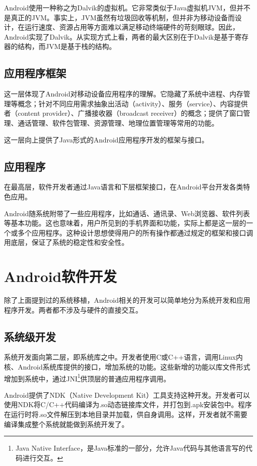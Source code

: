 Android使用一种称之为Dalvik的虚拟机。它非常类似于Java虚拟机JVM，但并不是真正的JVM。事实上，JVM虽然有垃圾回收等机制，但并非为移动设备而设计，在运行速度、资源占用等方面难以满足移动终端硬件的苛刻眼球。因此，Android实现了Dalvik。从实现方式上看，两者的最大区别在于Dalvik是基于寄存器的结构，而JVM是基于栈的结构。

\subsection{应用程序框架}
这一层体现了Android对移动设备应用程序的理解。它隐藏了系统中进程、内存管理等概念；针对不同应用需求抽象出活动（activity）、服务（service）、内容提供者（content provider）、广播接收器（broadcast receiver）的概念；提供了窗口管理、通话管理、软件包管理、资源管理、地理位置管理等常用的功能。

这一层向上提供了Java形式的Android应用程序开发的框架与接口。

\subsection{应用程序}
在最高层，软件开发者通过Java语言和下层框架接口，在Android平台开发各类特色应用。

Android随系统附带了一些应用程序，比如通话、通讯录、Web浏览器、软件列表等基本功能。这也意味着，用户所见到的手机界面和功能，实际上都是这一层的一个或多个应用程序。这种设计思想使得用户的所有操作都通过规定的框架和接口调用底层，保证了系统的稳定性和安全性。

\section{Android软件开发}
除了上面提到过的系统移植，Android相关的开发可以简单地分为系统开发和应用程序开发。两者都不涉及与硬件的直接交互。

\subsection{系统级开发}
系统开发面向第二层，即系统库之中。开发者使用C或C++语言，调用Linux内核、Android系统库提供的接口，增加系统的功能。这些新增的功能以库文件形式增加到系统中，通过JNI\footnote{Java Native Interface，是Java标准的一部分，允许Java代码与其他语言写的代码进行交互。}供顶层的普通应用程序调用。

Android提供了NDK（Native Development Kit）工具支持这种开发。开发者可以使用NDK将C/C++代码编译为.so动态链接库文件，并打包到.apk安装包中。程序在运行时将.so文件解压到本地目录并加载，供自身调用。这样，开发者就不需要编译集成整个系统就能做到系统开发了。

